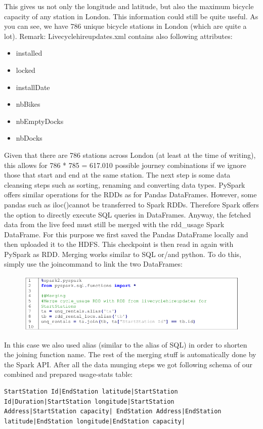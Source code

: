 \noindent This gives us not only the longitude and latitude, but also the maximum bicycle capacity of any station in London. This information could still be quite useful. As you can see, we have 786 unique bicycle stations in London (which are quite a lot).
Remark: Livecyclehireupdates.xml contains also following attributes:
\begin{itemize}
\item installed
\item locked
\item installDate
\item nbBikes
\item nbEmptyDocks
\item nbDocks
\end{itemize}
Given that there are 786 stations across London (at least at the time of writing), this allows for 786 * 785 = 617.010 possible journey combinations if we ignore those that start and end at the same station. The
next step is some data cleansing steps such as sorting, renaming and converting data types. PySpark offers
similar operations for the RDDs as for Pandas DataFrames. However, some pandas such as \glqq iloc()\grqq cannot
be transferred to Spark RDDs. Therefore Spark offers the option to directly execute SQL queries in
DataFrames. Anyway, the fetched data from the live feed must still be merged with the rdd\_usage Spark
DataFrame. For this purpose we first saved the Pandas DataFrame locally and then uploaded it to the
HDFS. This checkpoint is then read in again with PySpark as RDD. Merging works similar to SQL or/and
python. To do this, simply use the \glqq join\grqq command to link the two DataFrames:
\begin{figure}[H]
\hspace{-0.8cm}
\includegraphics[width=1.1\textwidth]{img/spark3}\label{pic:spark3}
\end{figure}
\noindent In this case we also used alias (similar to the alias of SQL) in order to shorten the joining function name. The rest of the merging stuff is automatically done by the Spark API. After all the data
munging steps we got following schema of our combined and prepared usage-stats table:
\begin{lstlisting}[breaklines=true]
StartStation Id|EndStation latitude|StartStation Id|Duration|StartStation longitude|StartStation
Address|StartStation capacity| EndStation Address|EndStation latitude|EndStation longitude|EndStation capacity|
\end{lstlisting}
